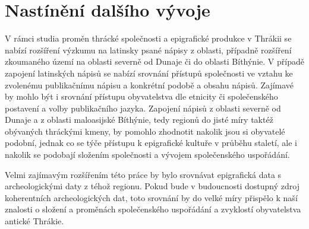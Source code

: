 
\section[nastínění-dalšího-vývoje]{Nastínění dalšího vývoje}

V rámci studia proměn thrácké společnosti a epigrafické produkce v Thrákii se nabízí rozšíření výzkumu na latinsky psané nápisy z oblasti, případně rozšíření zkoumaného území na oblasti severně od Dunaje či do oblasti Bíthýnie. V případě zapojení latinských nápisů se nabízí srovnání přístupů společnosti ve vztahu ke zvolenému publikačnímu nápisu a konkrétní podobě a obsahu nápisů. Zajímavé by mohlo být i srovnání přístupu obyvatelstva dle etnicity či společenského postavení a volby publikačního jazyka. Zapojení nápisů z oblasti severně od Dunaje a z oblasti maloasijské Bíthýnie, tedy regionů do jisté míry taktéž obývaných thráckými kmeny, by pomohlo zhodnotit nakolik jsou si obyvatelé podobní, jednak co se týče přístupu k epigrafické kultuře v průběhu staletí, ale i nakolik se podobají složením společnosti a vývojem společenského uspořádání.

Velmi zajímavým rozšířením této práce by bylo srovnávat epigrafická data s archeologickými daty z téhož regionu. Pokud bude v budoucnosti dostupný zdroj koherentních archeologických dat, toto srovnání by do velké míry přispělo k naší znalosti o složení a proměnách společenského uspořádání a zvyklostí obyvatelstva antické Thrákie.

